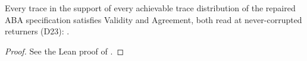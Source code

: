 \begin{theorem}
  \label{thm:aba-spec-safe}
  \leanok
  Every trace in the support of every achievable trace distribution of the repaired ABA specification satisfies Validity and Agreement, both read at never-corrupted returners (D23): .
\end{theorem}

\begin{proof}\leanok
  See the Lean proof of .
\end{proof}
